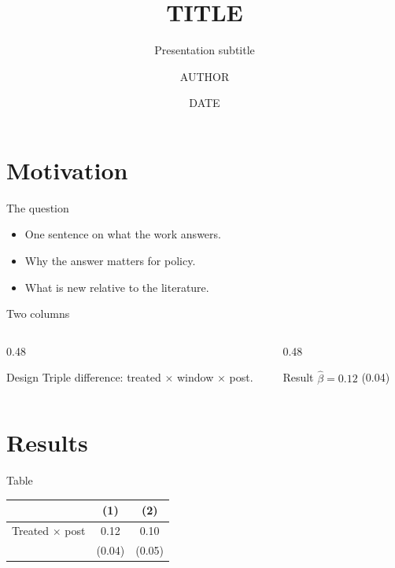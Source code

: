 \documentclass[aspectratio=169,11pt]{beamer}
\title{{{TITLE}}}
\subtitle{Presentation subtitle}
\author{{{AUTHOR}}}
\institute{{{INSTITUTION}}}
\date{{{DATE}}}
\begin{document}
\begin{frame}[plain]
  \titlepage
\end{frame}

\section{Motivation}

\begin{frame}{The question}
  \begin{itemize}
    \item One sentence on what the work answers.
    \item Why the answer matters for policy.
    \item \alert{What is new} relative to the literature.
  \end{itemize}
\end{frame}

\begin{frame}{Two columns}
  \begin{columns}[T]
    \begin{column}{0.48\textwidth}
      \begin{block}{Design}
        Triple difference: treated $\times$ window $\times$ post.
      \end{block}
    \end{column}
    \begin{column}{0.48\textwidth}
      \begin{exampleblock}{Result}
        $\hat\beta = 0.12$ (0.04)
      \end{exampleblock}
    \end{column}
  \end{columns}
\end{frame}

\section{Results}

\begin{frame}{Table}
  \centering
  \begin{tabular}{lcc}
    \toprule
    & (1) & (2) \\
    \midrule
    Treated $\times$ post & 0.12 & 0.10 \\
                         & (0.04) & (0.05) \\
    \bottomrule
  \end{tabular}
\end{frame}
\end{document}
